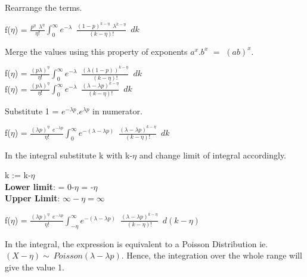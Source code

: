 \documentclass[12pt]{article}
\begin{document}
        \normalsize Rearrange the terms.\Large
        
        \begin{center}
        f($\eta$) = $\frac{p^{\eta}\,\,\,\lambda^{\eta}}{\eta!}\int_0^\infty  e^{-\lambda}\,\,\,\frac{(1-p)^{k-\eta}\,\,\,\lambda^{k-\eta}}{(k-\eta)!} \,\,\, dk$ 
        \end{center}
        
        \normalsize Merge the values using this property of exponents $a^{x}.b^{x}\,\, = \,\, (ab)^{x}$.\Large
        
        \begin{center}
        f($\eta$) = $\frac{(p\lambda)^{\eta}}{\eta!}\int_0^\infty  e^{-\lambda}\,\,\,\frac{(\lambda(1-p))^{k-\eta}}{(k-\eta)!} \,\,\, dk$  \\
        
        f($\eta$) = $\frac{(p\lambda)^{\eta}}{\eta!}\int_0^\infty  e^{-\lambda}\,\,\,\frac{(\lambda-\lambda p)^{k-\eta}}{(k-\eta)!} \,\,\, dk$ 
        \end{center}
        
        \normalsize Substitute 1 = $e^{-\lambda p}.e^{\lambda p}$ in numerator.\Large
        
        \begin{center}
        f($\eta$) = $\frac{(\lambda p)^{\eta}\,\,\,e^{-\lambda p}}{\eta!}\int_0^\infty  e^{-(\lambda-\lambda p)}\,\,\,\frac{(\lambda-\lambda p)^{k-\eta}}{(k-\eta)!} \,\,\, dk$ 
        \end{center}
        
        \normalsize In the integral substitute k with k-$\eta$ and change limit of integral accordingly.
        
        \begin{center}
        k\,\,:=\,\,k-$\eta$\\
        \textbf{Lower limit}: = 0-$\eta$ = -$\eta$ \\
        \textbf{Upper Limit}: $\infty-\eta = \infty$\Large
        \end{center}
        
        \begin{center}
        f($\eta$) = $\frac{(\lambda p)^{\eta}\,\,\,e^{-\lambda p}}{\eta!}\int_{-\eta}^{\infty} e^{-(\lambda-\lambda p)}\,\,\,\frac{(\lambda-\lambda p)^{k-\eta}}{(k-\eta)!} \,\,\, d(k-\eta)$ \\
        \end{center}
        
        \normalsize In the integral, the expression is equivalent to a Poisson Distribution ie. $(X-\eta) \sim\ Poisson(\lambda-\lambda p)$. Hence, the integration over the whole range will give the value 1.\Large
        
\end{document}
